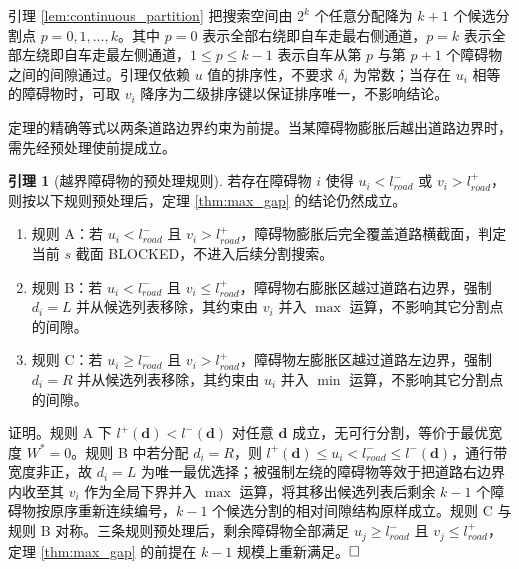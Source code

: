 \documentclass[a4paper,11pt]{ctexart}
\theoremstyle{definition}
\newtheorem{lemma}{引理}[section]
\begin{document}
引理 \ref{lem:continuous_partition} 把搜索空间由 $2^k$ 个任意分配降为 $k+1$ 个候选分割点 $p = 0, 1, \ldots, k$。其中 $p=0$ 表示全部右绕即自车走最右侧通道，$p=k$ 表示全部左绕即自车走最左侧通道，$1 \leq p \leq k-1$ 表示自车从第 $p$ 与第 $p+1$ 个障碍物之间的间隙通过。引理仅依赖 $u$ 值的排序性，不要求 $\delta_i$ 为常数；当存在 $u_i$ 相等的障碍物时，可取 $v_i$ 降序为二级排序键以保证排序唯一，不影响结论。

定理的精确等式以两条道路边界约束为前提。当某障碍物膨胀后越出道路边界时，需先经预处理使前提成立。

\begin{lemma}[越界障碍物的预处理规则]
\label{lem:boundary_trim}
若存在障碍物 $i$ 使得 $u_i < l_{road}^{-}$ 或 $v_i > l_{road}^{+}$，则按以下规则预处理后，定理 \ref{thm:max_gap} 的结论仍然成立。
\begin{enumerate}
    \item 规则 A：若 $u_i < l_{road}^{-}$ 且 $v_i > l_{road}^{+}$，障碍物膨胀后完全覆盖道路横截面，判定当前 $s$ 截面 BLOCKED，不进入后续分割搜索。
    \item 规则 B：若 $u_i < l_{road}^{-}$ 且 $v_i \leq l_{road}^{+}$，障碍物右膨胀区越过道路右边界，强制 $d_i = L$ 并从候选列表移除，其约束由 $v_i$ 并入 $\max$ 运算，不影响其它分割点的间隙。
    \item 规则 C：若 $u_i \geq l_{road}^{-}$ 且 $v_i > l_{road}^{+}$，障碍物左膨胀区越过道路左边界，强制 $d_i = R$ 并从候选列表移除，其约束由 $u_i$ 并入 $\min$ 运算，不影响其它分割点的间隙。
\end{enumerate}
\end{lemma}

证明。规则 A 下 $l^{+}(\mathbf{d}) < l^{-}(\mathbf{d})$ 对任意 $\mathbf{d}$ 成立，无可行分割，等价于最优宽度 $W^{*}=0$。规则 B 中若分配 $d_i = R$，则 $l^{+}(\mathbf{d}) \leq u_i < l_{road}^{-} \leq l^{-}(\mathbf{d})$，通行带宽度非正，故 $d_i = L$ 为唯一最优选择；被强制左绕的障碍物等效于把道路右边界内收至其 $v_i$ 作为全局下界并入 $\max$ 运算，将其移出候选列表后剩余 $k-1$ 个障碍物按原序重新连续编号，$k-1$ 个候选分割的相对间隙结构原样成立。规则 C 与规则 B 对称。三条规则预处理后，剩余障碍物全部满足 $u_j \geq l_{road}^{-}$ 且 $v_j \leq l_{road}^{+}$，定理 \ref{thm:max_gap} 的前提在 $k-1$ 规模上重新满足。$\hfill\Box$
\end{document}
